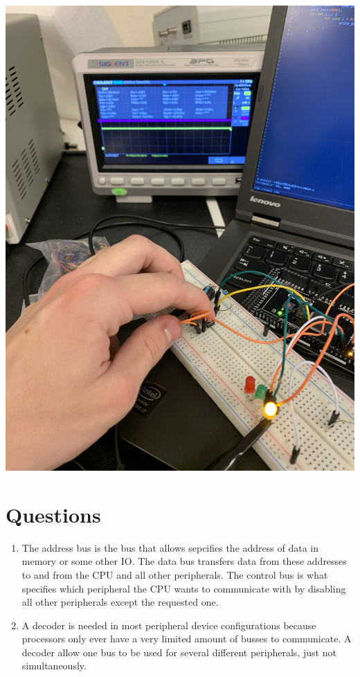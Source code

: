 \documentclass[]{article}
\begin{document}
\begin{center}
	\includegraphics[angle=-90,scale=.1]{3.jpg}
\end{center}
\pagebreak
\section{Questions}
\begin{enumerate}
	\item The address bus is the bus that allows sepcifies the address of data in memory or some other IO. The data bus transfers data from these addresses to and from the CPU and all other peripherals. The control bus is what specifies which peripheral the CPU wants to communicate with by disabling all other peripherals except the requested one.
	\item A decoder is needed in most peripheral device configurations because processors only ever have a very limited amount of busses to communicate. A decoder allow one bus to be used for several different peripherals, just not simultaneously.
\end{enumerate}
\end{document}
